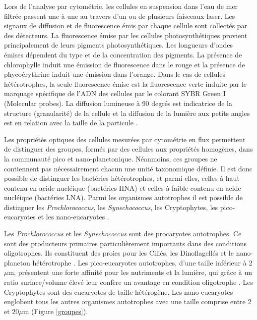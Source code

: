 \documentclass[12pt]{article}
\begin{document}
Lors de l’analyse par cytométrie, les cellules en suspension dans l’eau de mer filtrée passent une à une au travers d'un ou de plusieurs faisceaux laser. Les signaux de diffusion et de fluorescence émis par chaque cellule sont collectés par des détecteurs. La fluorescence émise par les cellules photosynthétiques provient principalement de leurs pigments photosynthétiques. Les longueurs d’ondes émises dépendent du type et de la concentration des pigments. La présence de chlorophylle induit une émission de fluorescence dans le rouge et la présence de phycoérythrine induit une émission dans l’orange. Dans le cas de cellules hétérotrophes, la seule fluorescence émise est la fluorescence verte induite par le marquage spécifique de l’ADN des cellules par le colorant SYBR Green I (Molecular probes). La diffusion lumineuse à 90 degrés est indicatrice de la structure (granularité) de la cellule \citep{Trask1982} et la diffusion de la lumière aux petits angles est en relation avec la taille de la particule \citep{Dubelaar2007}.

Les propriétés optiques des cellules mesurées par cytométrie en flux permettent de distinguer des groupes, formés par des cellules aux propriétés homogènes, dans la communauté pico et nano-planctonique. Néanmoins, ces groupes ne contiennent pas nécessairement chacun une unité taxonomique définie. Il est donc possible de distinguer les bactéries hétérotrophes, et parmi elles, celles à haut contenu en acide nucléique (bactéries HNA) et celles à faible contenu en acide nucléique (bactéries LNA). Parmi les organismes autotrophes il est possible de distinguer les \textit{Prochlorococcus}, les \textit{Synechococcus}, les Cryptophytes, les pico-eucaryotes et les nano-eucaryotes \citep{Marie1999}.

Les \textit{Prochlorococcus} et les \textit{Synechococcus} sont des procaryotes autotrophes. Ce sont des producteurs primaires particulièrement importants dans des conditions oligotrophes. Ils constituent des proies pour les Ciliés, les Dinoflagellés et le nano-plancton hétérotrophe \citep{Romagnan2015}. Les pico-eucaryotes autotrophes, d’une taille inférieur à 2$\mu$m, présentent une forte affinité pour les nutriments et la lumière, qui grâce à un ratio surface/volume élevé leur confère un avantage en condition oligotrophe \citep{LeQuere2005}. Les Cryptophytes sont des eucaryotes de taille hétérogène. Les nano-eucaryotes englobent tous les autres organismes autotrophes avec une taille comprise entre 2 et 20$\mu$m (Figure \ref{groupes}). 
\end{document}
